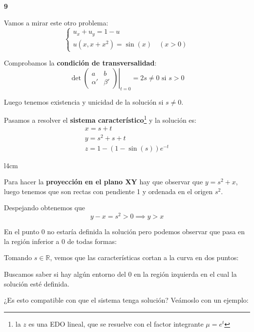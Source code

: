 
	\begin{example}{\bf 9}

		Vamos a mirar este otro problema:
		\[
		\left\{
		\begin{array}{l}
			u_x+ u_y = 1 - u\\
			u(x,x+x^2) = \sin(x) \quad (x>0)
		\end{array}
		\right.
		\]

		Comprobamos la {\bf condición de transversalidad}:
		\[\det \left. \begin{pmatrix}
			a & b \\
			\alpha' & \beta'
		\end{pmatrix} \right|_{t=0} = 2s \neq 0 \text{ si } s > 0 \]

		Luego tenemos existencia y unicidad de la solución si $s\neq0$.

		Pasamos a resolver el {\bf sistema característico}\footnote{la $z$ es una EDO lineal, que se resuelve con el factor integrante $\mu = e^t$} y la solución es:
		\[
		\begin{array}{l}
		x = s+t \\
		y = s^2 + s + t \\
		z = 1 - (1 - \sin(s) )e^{-t}
		\end{array}
		\]

		\begin{wrapfigure}{l}{4cm}
			\centering
		\end{wrapfigure}

		Para hacer la {\bf proyección en el plano XY} hay que observar que $y = s^2 + x $, luego tenemos que son rectas con pendiente 1 y ordenada en el origen $s^2$.

		Despejando obtenemos que
		\[y-x = s^2 > 0 \implies y > x\]

		En el punto 0 no estaría definida la solución pero podemos observar que pasa en la región inferior a 0 de todas formas:

		\clearpage
		Tomando $ s\in \mathbb{R} $, vemos que las características cortan a la curva en dos puntos:

		\begin{figure}[hbtp]
			\centering
		\end{figure}

		Buscamos saber si hay algún entorno del 0 en la región izquierda en el cual la solución esté definida.

		¿Es esto compatible con que el sistema tenga solución? Veámoslo con un ejemplo:


\end{example}
